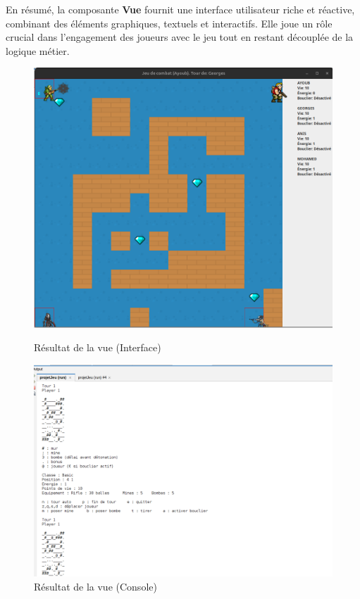 \documentclass[12pt]{article}
\begin{document}
En résumé, la composante \textbf{Vue} fournit une interface utilisateur riche et réactive, combinant des éléments graphiques, textuels et interactifs. Elle joue un rôle crucial dans l'engagement des joueurs avec le jeu tout en restant découplée de la logique métier.
\begin{figure}[!h]
\centering
\begin{minipage}{0.45\textwidth}
    \centering
    \includegraphics[scale=0.22]{images/interface.png}
    \caption{Résultat de la vue (Interface)}
\end{minipage}
\hfill
\begin{minipage}{0.45\textwidth}
    \centering
    \includegraphics[scale=0.22]{images/terminal.png}
    \caption{Résultat de la vue (Console)}
\end{minipage}
\end{figure}
\end{document}
